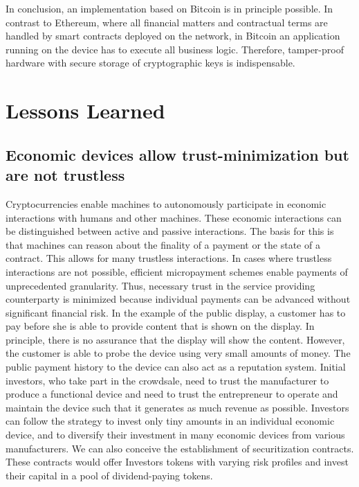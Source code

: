In conclusion, an implementation based on Bitcoin is in principle possible. In contrast to Ethereum, where all financial matters and contractual terms are handled by smart contracts deployed on the network, in Bitcoin an application running on the device has to execute all business logic. Therefore, tamper-proof hardware with secure storage of cryptographic keys is indispensable.


\section{Lessons Learned}

\subsection{Economic devices allow trust-minimization but are not trustless}
Cryptocurrencies enable machines to autonomously participate in economic interactions with humans and other machines. These economic interactions can be distinguished between active and passive interactions. The basis for this is that machines can reason about the finality of a payment or the state of a contract. This allows for many trustless interactions. In cases where trustless interactions are not possible, efficient micropayment schemes enable payments of unprecedented granularity. Thus, necessary trust in the service providing counterparty is minimized because individual payments can be advanced without significant financial risk. In the example of the public display, a customer has to pay before she is able to provide content that is shown on the display. In principle, there is no assurance that the display will show the content. However, the customer is able to probe the device using very small amounts of money. The public payment history to the device can also act as a reputation system. Initial investors, who take part in the crowdsale, need to trust the manufacturer to produce a functional device and need to trust the entrepreneur to operate and maintain the device such that it generates as much revenue as possible. Investors can follow the strategy to invest only tiny amounts in an individual economic device, and to diversify their investment in many economic devices from various manufacturers. We can also conceive the establishment of securitization contracts. These contracts would offer Investors tokens with varying risk profiles and invest their capital in a pool of dividend-paying tokens. 


